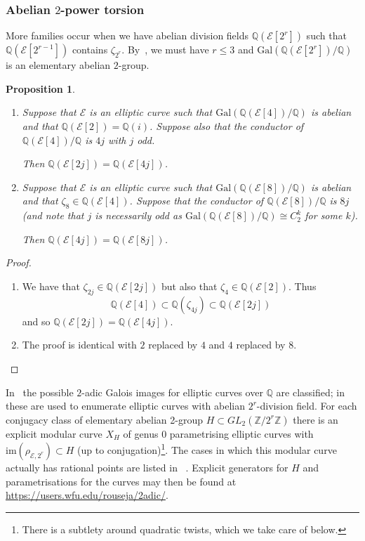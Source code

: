 \documentclass{amsart}
\theoremstyle{plain}
\newtheorem{prop}[theorem]{Proposition}
\theoremstyle{remark}
\newcommand{\Q}{\mathbb{Q}}
\newcommand{\Z}{\mathbb{Z}}
\newcommand{\E}{\mathcal{E}}
\newcommand{\Gal}{\mathrm{Gal}}
\newcommand{\im}{\mathrm{im}}
\begin{document}
\subsubsection{Abelian $2$-power torsion}
\label{sec:abelian-2}
More families occur when we have abelian division fields $\Q(\E[2^r])$ such that $\Q(\E[2^{r-1}])$ contains
$\zeta_{2^r}$. By~\cite{gonzalez-jimenezEllipticCurvesAbelian2016}, we must have $r \le 3$ and $\Gal(\Q(\E[2^r])/\Q)$ is
an elementary abelian $2$-group.

\begin{prop}\label{prop:ab-four-torsion}
  \leavevmode
  \begin{enumerate}
  \item Suppose that $\E$ is an elliptic curve such that $\Gal(\Q(\E[4])/\Q)$ is abelian and that $\Q(\E[2]) = \Q(i)$. Suppose also
    that the conductor of $\Q(\E[4])/\Q$ is $4j$ with $j$ odd.

    Then $\Q(\E[2j]) = \Q(\E[4j])$.
  \item Suppose that $\E$ is an elliptic curve such that $\Gal(\Q(\E[8])/\Q)$ is abelian and that $\zeta_8 \in \Q(\E[4])$. Suppose 
    that the conductor of $\Q(\E[8])/\Q$ is $8j$ (and note that $j$ is necessarily odd as $\Gal(\Q(\E[8])/\Q) \cong
    C_2^k$ for some $k$).

    Then $\Q(\E[4j]) = \Q(\E[8j])$.
  \end{enumerate}
\end{prop}
\begin{proof}
  \begin{enumerate}
  \item We have that $\zeta_{2j} \in \Q(\E[2j])$ but also that $\zeta_4 \in \Q(\E[2])$. Thus
    \[\Q(\E[4]) \subset \Q(\zeta_{4j}) \subset \Q(\E[2j])\]
    and so $\Q(\E[2j]) = \Q(\E[4j])$.
  \item The proof is identical with $2$ replaced by $4$ and $4$ replaced by $8$.
  \end{enumerate}
\end{proof}

In~\cite{rouse_elliptic_2015} the possible $2$-adic Galois images for elliptic curves over $\Q$ are classified; in
~\cite{gonzalez-jimenezEllipticCurvesAbelian2016} these are used to enumerate elliptic curves with abelian $2^r$-division
field. For each conjugacy class of elementary abelian 2-group $H \subset GL_2(\Z/2^r\Z)$ there is an explicit modular
curve $X_H$ of genus 0 parametrising elliptic curves with $\im(\rho_{\E, 2^r}) \subset H$ (up to
conjugation)\footnote{There is a subtlety around quadratic twists, which we take care of below.}. The cases
in which this modular curve actually has rational points are listed in
~\cite[Tables~3~and~4]{gonzalez-jimenezEllipticCurvesAbelian2016}. Explicit generators for $H$ and parametrisations for
the curves may then be found at \url{https://users.wfu.edu/rouseja/2adic/}.
\end{document}
